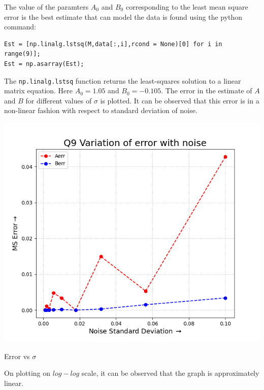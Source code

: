 \documentclass[12pt, a4paper]{report}
\begin{document}
The value of the paramters $A_0$ and $B_0$ corresponding to the least mean square error is the best estimate that can model the data is found using the python command:

\begin{verbatim}
Est = [np.linalg.lstsq(M,data[:,i],rcond = None)[0] for i in range(9)];
Est = np.asarray(Est);
\end{verbatim}

The \texttt{np.linalg.lstsq} function returns the least-squares solution to a linear matrix equation. Here $A_0 = 1.05$ and $B_0 = -0.105$. The error in the estimate of $A$ and $B$ for different values of $\sigma$ is plotted. It can be observed that this error is in a non-linear fashion with respect to standard deviation of noise.

\begin{center}
	\includegraphics[scale=0.85]{Figure_3} 
	\caption{Error vs $\sigma$}
	\label{fig:rawdata}
\end{center}

On plotting on $log-log$ scale, it can be observed that the graph is approximately linear.
\end{document}
